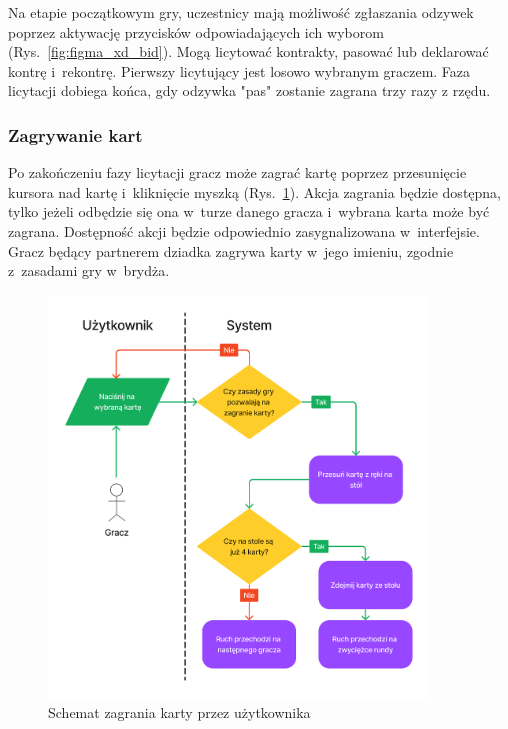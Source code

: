Na etapie początkowym gry, uczestnicy mają możliwość zgłaszania odzywek poprzez
aktywację przycisków odpowiadających ich wyborom (Rys.~\ref{fig:figma_xd_bid}).
Mogą licytować kontrakty, pasować lub
deklarować kontrę i~rekontrę. Pierwszy licytujący jest losowo
wybranym graczem. Faza licytacji dobiega końca, gdy odzywka "pas"\xspace zostanie zagrana
trzy razy z rzędu.


\FloatBarrier


\subsubsection{Zagrywanie kart}

Po zakończeniu fazy licytacji gracz może zagrać kartę poprzez
przesunięcie kursora nad kartę i~kliknięcie myszką (Rys.~\ref{fig:figma_xd_play_card}).
Akcja zagrania
będzie dostępna, tylko jeżeli odbędzie się ona w~turze danego gracza
i~wybrana karta może być zagrana.
Dostępność akcji będzie odpowiednio zasygnalizowana w~interfejsie.
Gracz będący partnerem dziadka zagrywa karty w~jego imieniu,
zgodnie z~zasadami gry w~brydża.

\begin{figure}[hbt!]
  \centering
  \includegraphics[width=0.9\textwidth]{img/schematy/play_card.png}
  \caption{Schemat zagrania karty przez użytkownika}
  \label{fig:figma_xd_play_card}
\end{figure}

